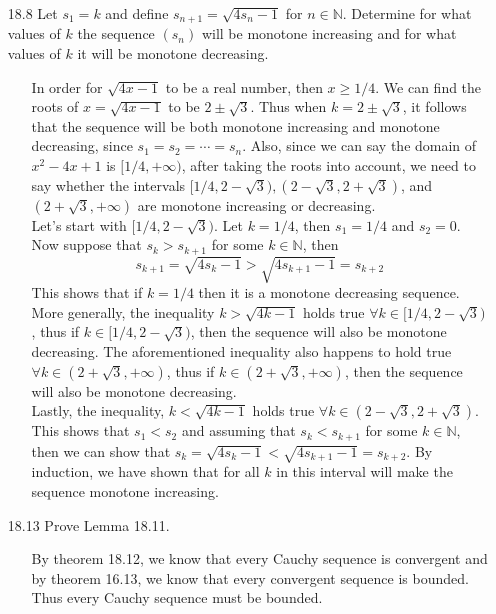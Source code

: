 \documentclass[12pt]{article}
\begin{document}
\begin{enumerate}
\item[18.8] Let $s_1 = k$ and define $s_{n+1} = \sqrt{4s_n - 1}$ for $n \in \mathbb{N}$. Determine for what values of $k$ the sequence $(s_n)$ will be monotone increasing and for what values of $k$ it will be monotone decreasing.
\begin{enumerate}
\item[] In order for $\sqrt{4x - 1}$ to be a real number, then $x \geq 1/4$. We can find
the roots of $x = \sqrt{4x - 1}$ to be $2 \pm \sqrt{3}$. Thus when $k = 2 \pm \sqrt{3}$, it
follows that the sequence will be both monotone increasing and monotone decreasing, since
$s_1 = s_2 = \cdots = s_n$. Also, since we can say the domain of $x^2 - 4x + 1$ is
$[1/4, +\infty)$, after taking the roots into account, we need to 
say whether the intervals $[1/4, 2 - \sqrt{3}), (2 - \sqrt{3}, 2 + \sqrt{3})$, and 
$(2 + \sqrt{3}, +\infty)$ are monotone increasing or decreasing. \\
Let's start with $[1/4, 2 - \sqrt{3})$. Let $k = 1/4$, then $s_1 = 1/4$ and 
$s_2 = 0$. Now suppose that $s_k > s_{k + 1}$ for some $k \in \mathbb{N}$, then
\[
s_{k + 1} = \sqrt{4s_k - 1} > \sqrt{4s_{k+1} - 1} = s_{k + 2}
\]
This shows that if $k = 1/4$ then it is a monotone decreasing sequence.
More generally, the inequality $k > \sqrt{4k - 1}$ holds true $\forall k \in [1/4, 2 - \sqrt{3})$,
thus if $k \in [1/4, 2 - \sqrt{3})$, then the sequence will also be monotone decreasing. The 
aforementioned inequality also happens to hold true $\forall k \in (2 + \sqrt{3}, +\infty)$, 
thus if $k \in (2 + \sqrt{3}, +\infty)$, then the sequence will also be monotone decreasing.\\
Lastly, the inequality, $k < \sqrt{4k - 1}$ holds true $\forall k \in (2 - \sqrt{3}, 2 + \sqrt{3})$.
This shows that $s_1 < s_2$ and assuming that $s_k < s_{k + 1}$ for some $k \in \mathbb{N}$, then
we can show that $s_k = \sqrt{4s_k - 1} < \sqrt{4s_{k+1} - 1} = s_{k + 2}$. By induction,
we have shown that for all $k$ in this interval will make the sequence monotone increasing.
\end{enumerate}

\item[18.13] Prove Lemma 18.11.
\begin{enumerate}
\item[] By theorem 18.12, we know that every Cauchy sequence is convergent and by theorem 16.13, 
we know that every convergent sequence is bounded. Thus every Cauchy sequence must be bounded.
\end{enumerate}


\end{enumerate}
\end{document}
